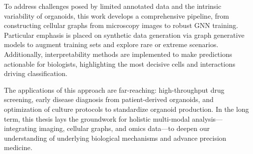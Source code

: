 To address challenges posed by limited annotated data and the intrinsic variability of organoids, this work develops a comprehensive pipeline, from constructing cellular graphs from microscopy images to robust GNN training. Particular emphasis is placed on synthetic data generation via graph generative models to augment training sets and explore rare or extreme scenarios. Additionally, interpretability methods are implemented to make predictions actionable for biologists, highlighting the most decisive cells and interactions driving classification.

The applications of this approach are far-reaching: high-throughput drug screening, early disease diagnosis from patient-derived organoids, and optimization of culture protocols to standardize organoid production. In the long term, this thesis lays the groundwork for holistic multi-modal analysis—integrating imaging, cellular graphs, and omics data—to deepen our understanding of underlying biological mechanisms and advance precision medicine.

\vspace{0.5cm}
